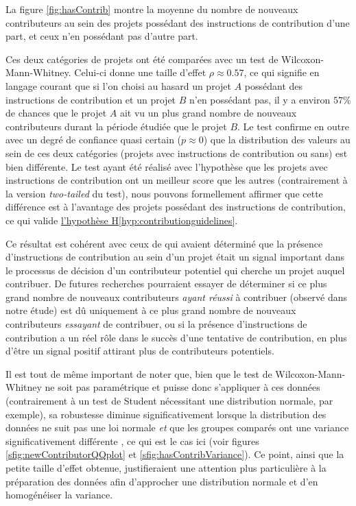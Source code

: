 \documentclass[dvipsnames,runningheads]{llncs}
\newcommand{\en}[1]{\foreignlanguage{english}{\emph{#1}}}
\begin{document}
    La figure \ref{fig:hasContrib} montre la moyenne du nombre de nouveaux contributeurs au sein des projets
    possédant des instructions de contribution d'une part, et ceux n'en possédant pas d'autre part.

    Ces deux catégories de projets ont été comparées avec un test de Wilcoxon-Mann-Whitney. Celui-ci donne une
    taille d'effet $ρ \approx 0.57$, ce qui signifie en langage courant que si l'on choisi au hasard un projet
    $A$ possédant des instructions de contribution et un projet $B$ n'en possédant pas, il y a environ $57\%$
    de chances que le projet $A$ ait vu un plus grand nombre de nouveaux contributeurs durant la période
    étudiée que le projet $B$. Le test confirme en outre avec un degré de confiance quasi certain ($p \approx
    0$) que la distribution des valeurs au sein de ces deux catégories (projets avec instructions de
    contribution ou sans) est bien différente. Le test ayant été réalisé avec l'hypothèse que les projets avec
    instructions de contribution ont un meilleur score que les autres (contrairement à la version
    \en{two-tailed} du test), nous pouvons formellement affirmer que cette différence est à l'avantage des
    projets possédant des instructions de contribution, ce qui valide
    \hyperref[hyp:contributionguidelines]{l'hypothèse H\ref*{hyp:contributionguidelines}}.

    Ce résultat est cohérent avec ceux de \textcite[p.~11]{signals-2019} qui avaient déterminé que la présence
    d'instructions de contribution au sein d'un projet était un signal important dans le processus de décision
    d'un contributeur potentiel qui cherche un projet auquel contribuer. De futures recherches pourraient
    essayer de déterminer si ce plus grand nombre de nouveaux contributeurs \emph{ayant réussi} à contribuer
    (observé dans notre étude) est dû uniquement à ce plus grand nombre de nouveaux contributeurs
    \emph{essayant} de contribuer, ou si la présence d'instructions de contribution a un réel rôle dans le
    succès d'une tentative de contribution, en plus d'être un signal positif attirant plus de contributeurs
    potentiels.

    Il est tout de même important de noter que, bien que le test de Wilcoxon-Mann-Whitney ne soit pas
    paramétrique et puisse donc s'appliquer à ces données (contrairement à un test de Student nécessitant une
    distribution normale, par exemple), sa robustesse diminue significativement lorsque la distribution des
    données ne suit pas une loi normale \emph{et} que les groupes comparés ont une variance significativement
    différente \parencite{WMW-robustness-1998}, ce qui est le cas ici (voir figures
    \ref{sfig:newContributorQQplot} et \ref{sfig:hasContribVariance}). Ce point, ainsi que la petite taille
    d'effet obtenue, justifieraient une attention plus particulière à la préparation des données afin
    d'approcher une distribution normale et d'en homogénéiser la variance.
\end{document}
